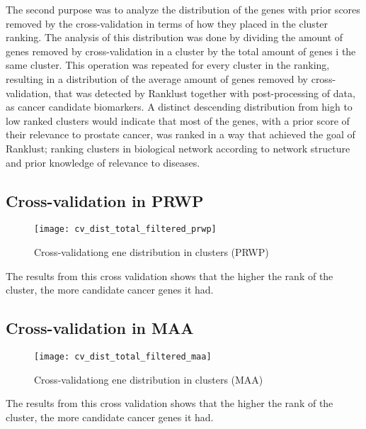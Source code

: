 The second purpose was to analyze the distribution of the genes with prior
scores removed by the cross-validation in terms of how they placed in the
cluster ranking. The analysis of this distribution was done by dividing the
amount of genes removed by cross-validation in a cluster by the total amount of
genes i the same cluster. This operation was repeated for every cluster in the
ranking, resulting in a distribution of the average amount of genes removed by
cross-validation, that was detected by Ranklust together with post-processing of
data, as cancer candidate biomarkers. A distinct descending distribution from
high to low ranked clusters would indicate that most of the genes, with a prior
score of their relevance to prostate cancer, was ranked in a way that achieved
the goal of Ranklust; ranking clusters in biological network according to
network structure and prior knowledge of relevance to diseases.

\subsection{Cross-validation in PRWP}
\begin{figure}[H]
    \caption{Cross-validationg ene distribution in clusters (PRWP)}
    \label{fig:irefweb-prwp}
    \texttt{[image: cv\_dist\_total\_filtered\_prwp]}
\end{figure}
The results from this cross validation shows that the higher the rank of the
cluster, the more candidate cancer genes it had.

\subsection{Cross-validation in MAA}
\begin{figure}[H]
    \caption{Cross-validationg ene distribution in clusters (MAA)}
    \label{fig:irefweb-maa}
    \texttt{[image: cv\_dist\_total\_filtered\_maa]}
\end{figure}
The results from this cross validation shows that the higher the rank of the
cluster, the more candidate cancer genes it had.

